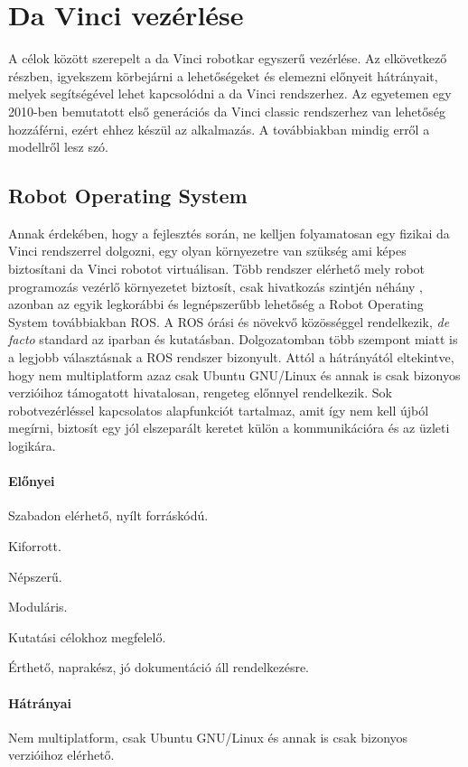 \documentclass[12pt,a4paper,oneside]{report} %
\begin{document}
\section{Da Vinci vezérlése}
\label{sec:davi}
A célok között szerepelt a da Vinci robotkar egyszerű vezérlése. 
Az elkövetkező részben, igyekszem körbejárni a lehetőségeket és elemezni előnyeit hátrányait, melyek segítségével lehet kapcsolódni a da Vinci rendszerhez. Az egyetemen egy 2010-ben bemutatott első generációs da Vinci classic rendszerhez van lehetőség hozzáférni, ezért ehhez készül az alkalmazás. A továbbiakban mindig erről a modellről lesz szó.
\subsection{Robot Operating System}
Annak érdekében, hogy a fejlesztés során, ne kelljen folyamatosan egy fizikai da Vinci rendszerrel dolgozni, egy olyan környezetre van szükség ami képes biztosítani da Vinci robotot virtuálisan. Több rendszer elérhető mely robot programozás vezérlő környezetet biztosít, csak hivatkozás szintjén néhány \cite{BibEntry2020May, montemerlo2003perspectives}, azonban az egyik legkorábbi és legnépszerűbb lehetőség a Robot Operating System \cite{quigley2009ros} továbbiakban ROS. A ROS órási és növekvő közösséggel rendelkezik, \textit{de facto} standard az iparban és kutatásban. Dolgozatomban több szempont miatt is a legjobb választásnak a ROS rendszer bizonyult. Attól a hátrányától eltekintve, hogy nem multiplatform azaz csak Ubuntu GNU/Linux és annak is csak bizonyos verzióihoz támogatott hivatalosan, rengeteg előnnyel rendelkezik. Sok robotvezérléssel kapcsolatos alapfunkciót tartalmaz, amit így nem kell újból megírni, biztosít egy jól elszeparált keretet külön a kommunikációra és az üzleti logikára.
\paragraph{Előnyei} 
\begin{compactitem}
	\item Szabadon elérhető, nyílt forráskódú.
	\item Kiforrott.
	\item Népszerű.
	\item Moduláris.
	\item Kutatási célokhoz megfelelő.
	\item Érthető, naprakész, jó dokumentáció áll rendelkezésre.
\end{compactitem}
\paragraph{Hátrányai} 
\begin{compactitem}
	\item Nem multiplatform, csak Ubuntu GNU/Linux és annak is csak bizonyos verzióihoz elérhető.
\end{compactitem}
\end{document}
